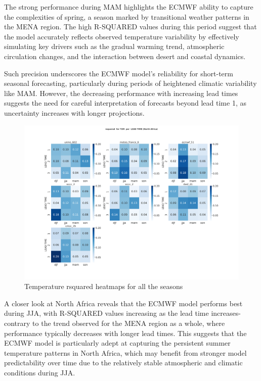 The strong performance during MAM highlights the ECMWF ability to capture the complexities of spring, a season marked by transitional weather patterns in the MENA region. The high R-SQUARED values during this period suggest that the model accurately reflects observed temperature variability by effectively simulating key drivers such as the gradual warming trend, atmospheric circulation changes, and the interaction between desert and coastal dynamics.

Such precision underscores the ECMWF model's reliability for short-term seasonal forecasting, particularly during periods of heightened climatic variability like MAM. However, the decreasing performance with increasing lead times suggests the need for careful interpretation of forecasts beyond lead time 1, as uncertainty increases with longer projections.

\begin{figure}[H]
    \centering
    \includegraphics[width=1\linewidth]{plots/det/rsquared/rsquared_T2M_NorthAfrica.png}
    \caption{Temperature rsquared heatmaps for all the seasons}
\end{figure}
A closer look at North Africa reveals that the ECMWF model performs best during JJA, with R-SQUARED values increasing as the lead time increases-contrary to the trend observed for the MENA region as a whole, where performance typically decreases with longer lead times. This suggests that the ECMWF model is particularly adept at capturing the persistent summer temperature patterns in North Africa, which may benefit from stronger model predictability over time due to the relatively stable atmospheric and climatic conditions during JJA.

